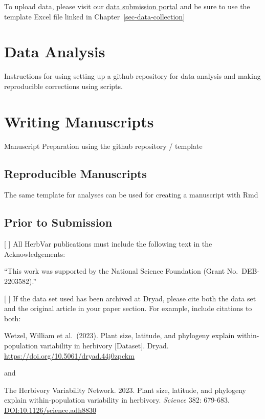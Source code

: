 \documentclass[
  letterpaper,
  oneside,
  open=any]{scrbook}
\begin{document}
To upload data, please visit our
\href{https://herbvar.shinyapps.io/data_portal_actual/}{data submission
portal} and be sure to use the template Excel file linked in
Chapter~\ref{sec-data-collection}

\chapter{Data Analysis}\label{sec-data-analysis}

Instructions for using setting up a github repository for data analysis
and making reproducible corrections using scripts.

\chapter{Writing Manuscripts}\label{sec-publications}

Manuscript Preparation using the github repository / template

\section{Reproducible Manuscripts}\label{reproducible-manuscripts}

The same template for analyses can be used for creating a manuscript
with Rmd

\section{Prior to Submission}\label{prior-to-submission}

{[} {]} All HerbVar publications must include the following text in the
Acknowledgements:

``This work was supported by the National Science Foundation (Grant
No.~DEB-2203582).''

{[} {]} If the data set used has been archived at Dryad, please cite
both the data set and the original article in your paper section. For
example, include citations to both:

Wetzel, William et al.~(2023). Plant size, latitude, and phylogeny
explain within-population variability in herbivory {[}Dataset{]}. Dryad.
\url{https://doi.org/10.5061/dryad.44j0zpckm}

and

The Herbivory Variability Network. 2023. Plant size, latitude, and
phylogeny explain within-population variability in herbivory.
\emph{Science} 382: 679-683. \url{DOI:10.1126/science.adh8830}
\end{document}
